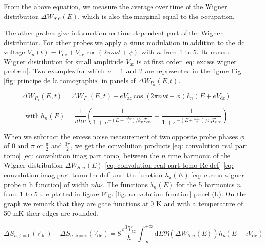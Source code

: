 From the above equation, we measure the average over time of the Wigner distribution $\Delta W_{S,0}\left(E\right)$, which is also the marginal equal to the occupation.

The other probes give information on time dependent part of the Wigner distribution.
For other probes we apply a sinus modulation in addition to the dc voltage $V_{n}\left(t\right) = V_{\mathrm{dc}}+V_{\mathrm{ac}}\cos\left(2\pi n \nu t + \phi\right)$ with $n$ from 1 to 5.
Its excess Wigner distribution for small amplitude $V_{\mathrm{ac}}$ is at first order \eqref{eq: excess wigner probe n}.
Two examples for which $n = 1$ and $2$ are represented in the figure Fig. \ref{fig: principe de la tomographie} in panels of $\Delta W_{P_{n}}\left(E,t\right)$.

\begin{equation}
\Delta W_{P_{n}}\left(E,t\right) = \Delta W_{P_{0}}\left(E,t\right)-eV_{\mathrm{ac}}\cos\left(2\pi n \nu t + \phi\right)h_{n}\left(E+eV_{\mathrm{dc}}\right) \label{eq: excess wigner probe n}
\end{equation}

\begin{equation}
\mathrm{with}\;h_{n}\left(E\right)=\frac{1}{nh\nu}\left(\frac{1}{1+e^{-\left(E-\frac{nh\nu}{2}\right)/k_{\mathrm{B}}T_{\mathrm{elec}}}}-\frac{1}{1+e^{-\left(E+\frac{nh\nu}{2}\right)/k_{\mathrm{B}}T_{\mathrm{elec}}}}\right) \label{eq: excess wigner probe n h function}
\end{equation}

When we subtract the excess noise measurement of two opposite probe phases $\phi$ of $0$ and $\pi$ or $\frac{\pi}{2}$ and $\frac{3\pi}{2}$, we get the convolution products \eqref{eq: convolution real part tomo} \eqref{eq: convolution imag part tomo} between the $n$ time harmonic of the Wigner distribution $\Delta W_{S,n}\left(E\right)$ \eqref{eq: convolution real part tomo Re def} \eqref{eq: convolution imag part tomo Im def} and the function $h_{n}\left(E\right)$ \eqref{eq: excess wigner probe n h function} of width $nh\nu$.
The functions $h_{n}\left(E\right)$ for the 5 harmonics $n$ from 1 to 5 are plotted in figure Fig. \ref{fig: convolution function} panel (b).
On the graph we remark that they are gate functions at 0 K and with a temperature of 50 mK their edges are rounded.

\begin{equation}
\Delta S_{n,\phi=0}\left(V_{\mathrm{dc}}\right)-\Delta S_{n,\phi=\pi}\left(V_{\mathrm{dc}}\right) = 8\frac{e^{3}V_{\mathrm{ac}}}{h}\int_{-\infty}^{+\infty}\mathrm{d}E\Re\left(\Delta W_{S,n}\left(E\right)\right)h_{n}\left(E+eV_{\mathrm{dc}}\right) \label{eq: convolution real part tomo}
\end{equation}

